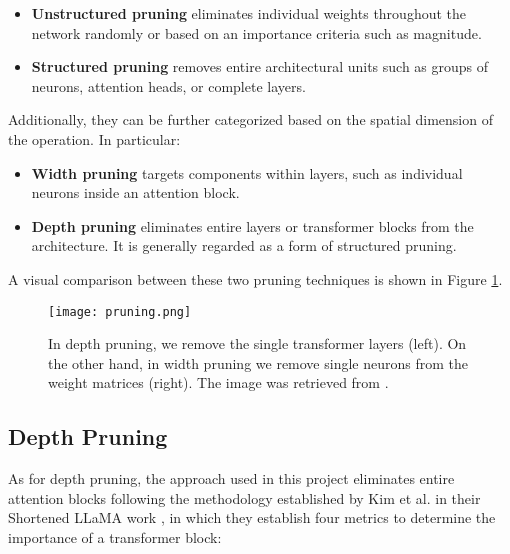 \begin{itemize}
    \item \textbf{Unstructured pruning} eliminates individual weights throughout the network randomly or based on an importance criteria such as magnitude.
    \item \textbf{Structured pruning} removes entire architectural units such as groups of neurons, attention heads, or complete layers.
\end{itemize}

Additionally, they can be further categorized based on the spatial dimension of the operation. In particular:
\begin{itemize}
    \item \textbf{Width pruning} targets components within layers, such as individual neurons inside an attention block.
    \item \textbf{Depth pruning} eliminates entire layers or transformer blocks from the architecture. It is generally regarded as a form of structured pruning.
\end{itemize}

A visual comparison between these two pruning techniques is shown in Figure \ref{fig:pruning_comparison}.

\begin{figure}[htbp]
    \centering
    \texttt{[image: pruning.png]}
    \caption[Comparison of Depth and Width Pruning]{In depth pruning, we remove the single transformer layers (left). On the other hand, in width pruning we remove single neurons from the weight matrices (right). The image was retrieved from \cite{shortened_llama}.}
    \label{fig:pruning_comparison}
\end{figure}

\subsection{Depth Pruning} \label{depth_pruning}

As for depth pruning, the approach used in this project eliminates entire attention blocks following the methodology established by Kim et al. in their Shortened LLaMA work \cite{shortened_llama}, in which they establish four metrics to determine the importance of a transformer block:


